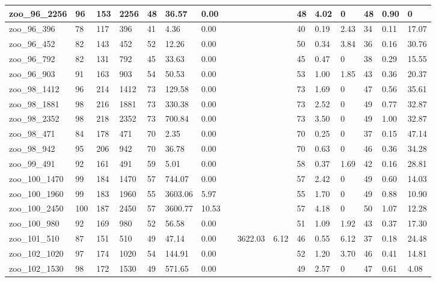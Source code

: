 \begin{landscape}
\begin{longtable}{llllllllllllllll}
zoo\_96\_2256 & 96 & 153 & 2256 & 48 & 36.57 & 0.00 &  &  &  & 48 & 4.02 & 0 & 48 & 0.90 & 0 \\ \hline 
zoo\_96\_396 & 78 & 117 & 396 & 41 & 4.36 & 0.00 &  &  &  & 40 & 0.19 & 2.43 & 34 & 0.11 & 17.07 \\ \hline 
zoo\_96\_452 & 82 & 143 & 452 & 52 & 12.26 & 0.00 &  &  &  & 50 & 0.34 & 3.84 & 36 & 0.16 & 30.76 \\ \hline 
zoo\_96\_792 & 82 & 131 & 792 & 45 & 33.63 & 0.00 &  &  &  & 45 & 0.47 & 0 & 38 & 0.29 & 15.55 \\ \hline 
zoo\_96\_903 & 91 & 163 & 903 & 54 & 50.53 & 0.00 &  &  &  & 53 & 1.00 & 1.85 & 43 & 0.36 & 20.37 \\ \hline 
zoo\_98\_1412 & 96 & 214 & 1412 & 73 & 129.58 & 0.00 &  &  &  & 73 & 1.69 & 0 & 47 & 0.56 & 35.61 \\ \hline 
zoo\_98\_1881 & 98 & 216 & 1881 & 73 & 330.38 & 0.00 &  &  &  & 73 & 2.52 & 0 & 49 & 0.77 & 32.87 \\ \hline 
zoo\_98\_2352 & 98 & 218 & 2352 & 73 & 700.84 & 0.00 &  &  &  & 73 & 3.50 & 0 & 49 & 1.00 & 32.87 \\ \hline 
zoo\_98\_471 & 84 & 178 & 471 & 70 & 2.35 & 0.00 &  &  &  & 70 & 0.25 & 0 & 37 & 0.15 & 47.14 \\ \hline 
zoo\_98\_942 & 95 & 206 & 942 & 70 & 36.78 & 0.00 &  &  &  & 70 & 0.63 & 0 & 46 & 0.36 & 34.28 \\ \hline 
zoo\_99\_491 & 92 & 161 & 491 & 59 & 5.01 & 0.00 &  &  &  & 58 & 0.37 & 1.69 & 42 & 0.16 & 28.81 \\ \hline 
zoo\_100\_1470 & 99 & 184 & 1470 & 57 & 744.07 & 0.00 &  &  &  & 57 & 2.42 & 0 & 49 & 0.60 & 14.03 \\ \hline 
zoo\_100\_1960 & 99 & 183 & 1960 & 55 & 3603.06 & 5.97 &  &  &  & 55 & 1.70 & 0 & 49 & 0.88 & 10.90 \\ \hline 
zoo\_100\_2450 & 100 & 187 & 2450 & 57 & 3600.77 & 10.53 &  &  &  & 57 & 4.18 & 0 & 50 & 1.07 & 12.28 \\ \hline 
zoo\_100\_980 & 92 & 169 & 980 & 52 & 56.58 & 0.00 &  &  &  & 51 & 1.09 & 1.92 & 43 & 0.37 & 17.30 \\ \hline 
zoo\_101\_510 & 87 & 151 & 510 & 49 & 47.14 & 0.00 &  & 3622.03 & 6.12 & 46 & 0.55 & 6.12 & 37 & 0.18 & 24.48 \\ \hline 
zoo\_102\_1020 & 97 & 174 & 1020 & 54 & 144.91 & 0.00 &  &  &  & 52 & 1.20 & 3.70 & 46 & 0.41 & 14.81 \\ \hline 
zoo\_102\_1530 & 98 & 172 & 1530 & 49 & 571.65 & 0.00 &  &  &  & 49 & 2.57 & 0 & 47 & 0.61 & 4.08 \\ \hline 

\end{longtable}
\end{landscape}
